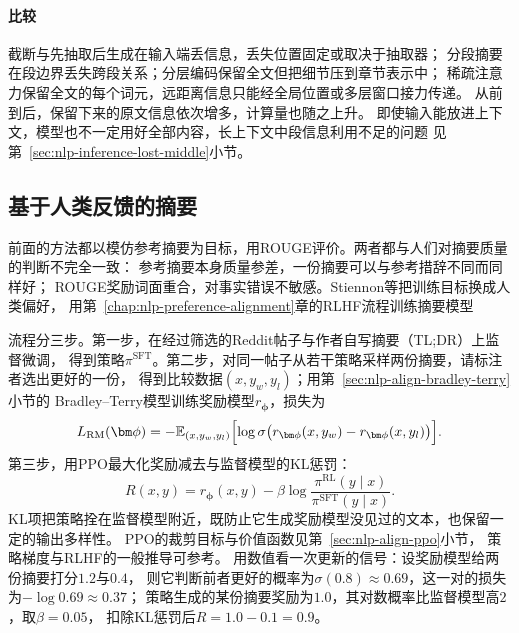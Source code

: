 \paragraph{比较}
截断与先抽取后生成在输入端丢信息，丢失位置固定或取决于抽取器；
分段摘要在段边界丢失跨段关系；分层编码保留全文但把细节压到章节表示中；
稀疏注意力保留全文的每个词元，远距离信息只能经全局位置或多层窗口接力传递。
从前到后，保留下来的原文信息依次增多，计算量也随之上升。
即使输入能放进上下文，模型也不一定用好全部内容，长上下文中段信息利用不足的问题
见第~\ref{sec:nlp-inference-lost-middle}小节。

\subsection{基于人类反馈的摘要}
\label{sec:nlp-generation-feedback-summary}

前面的方法都以模仿参考摘要为目标，用ROUGE评价。两者都与人们对摘要质量的判断不完全一致：
参考摘要本身质量参差，一份摘要可以与参考措辞不同而同样好；
ROUGE奖励词面重合，对事实错误不敏感。Stiennon等把训练目标换成人类偏好，
用第~\ref{chap:nlp-preference-alignment}章的RLHF流程训练摘要模型

流程分三步。第一步，在经过筛选的Reddit帖子与作者自写摘要（TL;DR）上监督微调，
得到策略$\pi^{\mathrm{SFT}}$。第二步，对同一帖子从若干策略采样两份摘要，请标注者选出更好的一份，
得到比较数据$(x,y_w,y_l)$；用第~\ref{sec:nlp-align-bradley-terry}小节的
Bradley–Terry模型训练奖励模型$r_{\bm\phi}$，损失为
\begin{equation}
  L_{\mathrm{RM}}(\bm\phi)=-\mathbb{E}_{(x,y_w,y_l)}
  \Bigl[\log\sigma\bigl(r_{\bm\phi}(x,y_w)-r_{\bm\phi}(x,y_l)\bigr)\Bigr].
  \label{eq:nlp-generation-summary-rm}
\end{equation}
第三步，用PPO最大化奖励减去与监督模型的KL惩罚：
\begin{equation}
  R(x,y)=r_{\bm\phi}(x,y)-\beta\log\frac{\pi^{\mathrm{RL}}(y\mid x)}{\pi^{\mathrm{SFT}}(y\mid x)}.
  \label{eq:nlp-generation-summary-ppo}
\end{equation}
KL项把策略拴在监督模型附近，既防止它生成奖励模型没见过的文本，也保留一定的输出多样性。
PPO的裁剪目标与价值函数见第~\ref{sec:nlp-align-ppo}小节，
策略梯度与RLHF的一般推导可参考。
用数值看一次更新的信号：设奖励模型给两份摘要打分$1.2$与$0.4$，
则它判断前者更好的概率为$\sigma(0.8)\approx0.69$，这一对的损失为$-\log0.69\approx0.37$；
策略生成的某份摘要奖励为$1.0$，其对数概率比监督模型高$2$，取$\beta=0.05$，
扣除KL惩罚后$R=1.0-0.1=0.9$。

